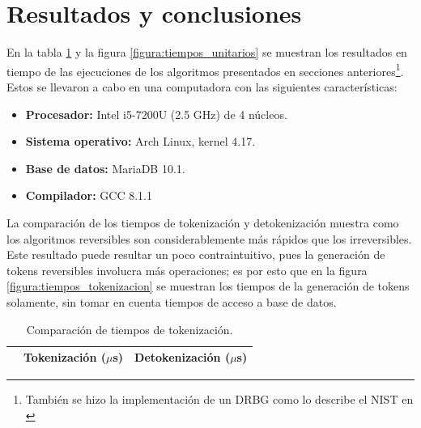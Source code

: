 %
%
%

\section{Resultados y conclusiones}

En la tabla \ref{tabla:tiempos_tokenizacion} y la figura
\ref{figura:tiempos_unitarios} se muestran los resultados en tiempo de
las ejecuciones de los algoritmos presentados en secciones
anteriores\footnote{También se hizo la implementación de un DRBG como lo
describe el NIST en \cite{nist_aleatorios}}. Estos se llevaron a cabo en una
computadora con las siguientes características:

\begin{itemize}
  \item \textbf{Procesador:} Intel i5-7200U (2.5 GHz) de 4 núcleos.
  \item \textbf{Sistema operativo:} Arch Linux, kernel 4.17.
  \item \textbf{Base de datos:} MariaDB 10.1.
  \item \textbf{Compilador:} GCC 8.1.1
\end{itemize}

La comparación de los tiempos de tokenización y detokenización muestra como los
algoritmos reversibles son considerablemente más rápidos que los irreversibles.
Este resultado puede resultar un poco contraintuitivo, pues la generación de
tokens reversibles involucra más operaciones; es por esto que en la figura
\ref{figura:tiempos_tokenizacion} se muestran los tiempos de la generación de
tokens solamente, sin tomar en cuenta tiempos de acceso a base de datos.


\begin{table}
  \renewcommand{\arraystretch}{1.3}
  \centering
  \caption{Comparación de tiempos de tokenización.}
  \label{tabla:tiempos_tokenizacion}
  \begin{tabular}{c c c}
    \hline
     & Tokenización ($\mu$s) & Detokenización ($\mu$s) \\
    \hline
    
    \hline
  \end{tabular}
\end{table}


